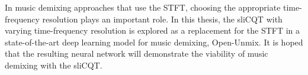 \documentclass[letter,12pt]{article}
\begin{document}
In music demixing approaches that use the STFT, choosing the appropriate time-frequency resolution plays an important role. In this thesis, the sliCQT with varying time-frequency resolution is explored as a replacement for the STFT in a state-of-the-art deep learning model for music demixing, Open-Unmix. It is hoped that the resulting neural network will demonstrate the viability of music demixing with the sliCQT.

\vfill
\clearpage %


\begingroup
{}
\setlength\bibitemsep{0.15em}
\printbibheading[title={References},heading=bibnumbered]
\printbibliography[heading=none]
\endgroup

\vfill
\clearpage %
\end{document}
